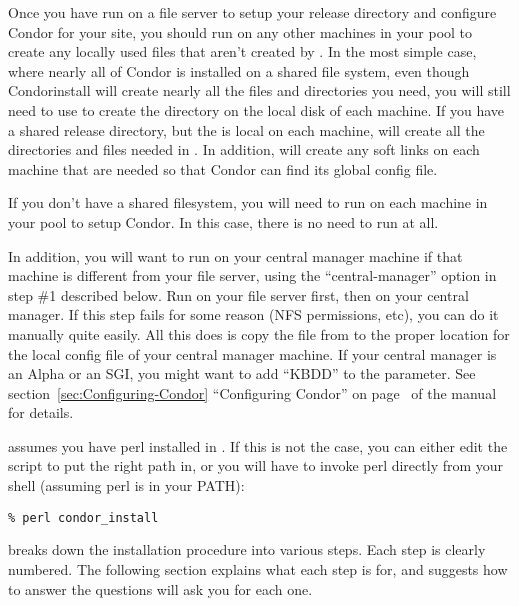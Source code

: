 Once you have run  on a file server to setup your
release directory and configure Condor for your site, you should run
 on any other machines in your pool to create any locally
used files that aren't created by .  In the most
simple case, where nearly all of Condor is installed on a shared file
system, even though Condor{install} will create nearly all the files
and directories you need, you will still need to use  to
create the  directory on the local disk of each machine.
If you have a shared release directory, but the  is
local on each machine,  will create all the directories
and files needed in .  In addition, 
will create any soft links on each machine that are needed so that
Condor can find its global config file.

If you don't have a shared filesystem, you will need to run
 on each machine in your pool to setup Condor.  In
this case, there is no need to run  at all.

In addition, you will want to run  on your central
manager machine if that machine is different from your file server,
using the ``central-manager'' option in step \#1 described below.  Run
 on your file server first, then on your central
manager.  If this step fails for some reason (NFS permissions, etc),
you can do it manually quite easily.  All this does is copy the
 file from
 to the proper location for the local config
file of your central manager machine.  If your central manager is an
Alpha or an SGI, you might want to add ``KBDD'' to the
 parameter.  See
section~\ref{sec:Configuring-Condor} ``Configuring Condor'' on
page~\pageref{sec:Configuring-Condor} of the manual for details.

 assumes you have perl installed in .  If
this is not the case, you can either edit the script to put the right
path in, or you will have to invoke perl directly from your shell
(assuming perl is in your PATH):
\begin{verbatim}
% perl condor_install
\end{verbatim}

 breaks down the installation procedure into various
steps.  Each step is clearly numbered.  The following section explains
what each step is for, and suggests how to answer the questions
 will ask you for each one.

